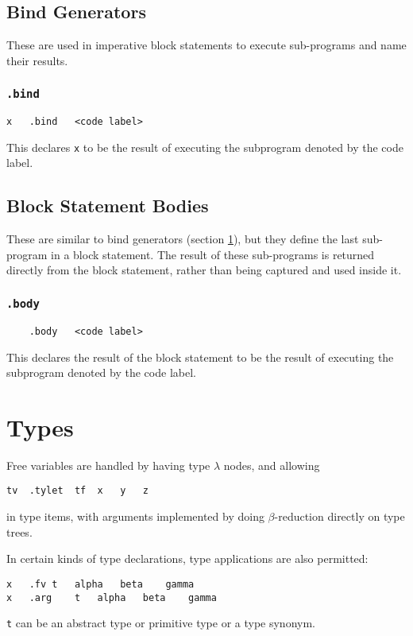 \documentclass{report}
\newcommand\stringcode[1]{\texttt{#1}}
\begin{document}
\section{Bind Generators}
\label{bind}

These are used in imperative block statements to execute sub-programs and name their results.

\subsection{\stringcode{.bind}}

\begin{verbatim}
x	.bind	<code label>
\end{verbatim}

This declares \stringcode{x} to be the result of executing the subprogram denoted by the code label.

\section{Block Statement Bodies}
\label{body}

These are similar to bind generators (section \ref{bind}), but they define the last sub-program in a block statement.
The result of these sub-programs is returned directly from the block statement, rather than being captured and used inside it.

\subsection{\stringcode{.body}}

\begin{verbatim}
	.body	<code label>
\end{verbatim}

This declares the result of the block statement to be the result of executing the subprogram denoted by the code label.

\chapter{Types}

Free variables are handled by having type $\lambda$ nodes, and allowing
\begin{verbatim}
tv	.tylet	tf	x	y	z
\end{verbatim}
in type items, with arguments implemented by doing $\beta$-reduction directly on type trees.

In certain kinds of type declarations, type applications are also permitted:
\begin{verbatim}
x	.fv	t	alpha	beta	gamma
x	.arg	t	alpha	beta	gamma
\end{verbatim}
\verb+t+ can be an abstract type or primitive type or a type synonym.
\end{document}
